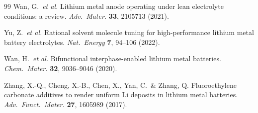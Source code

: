 \documentclass[11pt]{article}
\theoremstyle{plain}
\theoremstyle{definition}
\theoremstyle{remark}
\begin{document}
\begin{thebibliography}{99}
Wan, G.\ \textit{et al.}
Lithium metal anode operating under lean electrolyte conditions:
a review.
\textit{Adv.\ Mater.} \textbf{33}, 2105713 (2021).

Yu, Z.\ \textit{et al.}
Rational solvent molecule tuning for high-performance lithium metal
battery electrolytes.
\textit{Nat.\ Energy} \textbf{7}, 94--106 (2022).

Wan, H.\ \textit{et al.}
Bifunctional interphase-enabled lithium metal batteries.
\textit{Chem.\ Mater.} \textbf{32}, 9036--9046 (2020).

Zhang, X.-Q., Cheng, X.-B., Chen, X., Yan, C.\ \& Zhang, Q.
Fluoroethylene carbonate additives to render uniform Li deposits in
lithium metal batteries.
\textit{Adv.\ Funct.\ Mater.} \textbf{27}, 1605989 (2017).

\end{thebibliography}
\end{document}
